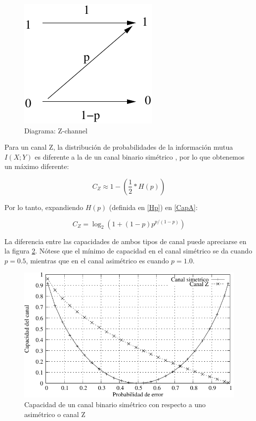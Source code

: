\begin{figure}[th]
  \begin{center}
    \includegraphics[scale=0.5]{graphs/zchannel}
  \end{center}
  \caption{Diagrama: Z-channel}
  \label{fig:Gal}
\end{figure}

Para un canal Z, la distribución de probabilidades de la información mutua $I(X;Y)$ es diferente a la de un canal binario simétrico \cite{Tallini:02}, por lo que obtenemos un máximo diferente:

\begin{equation}\label{CapA}
C_{Z} \approx 1 - \left(\frac{1}{2}*H(p)\right)
\end{equation}

Por lo tanto, expandiendo $H(p)$ (definida en \ref{Hp}) en \ref{CapA}:

$$ C_{Z} = \log_2\left(1+(1-p) p^{p/(1-p)}\right) $$

La diferencia entre las capacidades de ambos tipos de canal puede apreciarse en la figura \ref{fig:CompBZ}. Nótese que el mínimo de capacidad en el canal simétrico se da cuando $p=0.5$, mientras que en el canal asimétrico es cuando $p=1.0$.

\begin{figure}[th]
  \begin{center}
    \includegraphics[scale=0.9]{graphs/grafico_comparacion_capacidad_binaria_z}
  \end{center}
  \caption{Capacidad de un canal binario simétrico con respecto a uno asimétrico o canal Z}
  \label{fig:CompBZ}
\end{figure}


